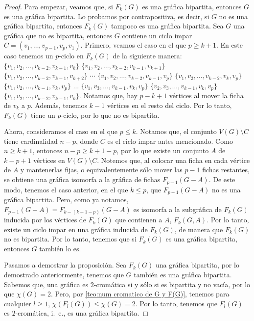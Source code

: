 \begin{proof}
    Para empezar, veamos que, si $F_k(G)$ es una gr\'afica bipartita, entonces
    $G$ es una gr\'afica bipartita. Lo probamos por contrapositiva, es decir, si
    $G$ no es una gr\'afica bipartita, entonces $F_k(G)$ tampoco es una
    gr\'afica bipartita. Sea $G$ una gr\'afica que no es bipartita, entonces $G$
    contiene un ciclo impar $C=(v_1, \dots, v_{p-1}, v_p, v_1)$. Primero, veamos
    el caso en el que $p \geq k+1$. En este caso tenemos un $p$-ciclo en
    $F_k(G)$ de la siguiente manera: $\{v_1, v_2, \dots, v_{k-2}, v_{k-1},
    v_k\}$ $\{v_1, v_2, \dots, v_{k-2}, v_{k-1}, v_{k+1}\}$ $\{v_1, v_2, \dots,
    v_{k-2}, v_{k-1}, v_{k+2}\}$ $\cdots$ $\{v_1, v_2, \dots, v_{k-2}, v_{k-1},
    v_p\}$ $\{v_1, v_2, \dots, v_{k-2}, v_k, v_p\}$ $\{v_1, v_2, \dots, v_{k-1},
    v_k, v_p\}$ $\dots$ $\{v_1, v_3, \dots, v_{k-1}, v_k, v_p\}$ $\{v_2, v_3,
    \dots, v_{k-1}, v_k, v_p\}$ $\{v_1, v_2, \dots, v_{k-2}, v_{k-1}, v_k\}$.
    Notamos que, hay $p-k+1$ v\'ertices al mover la ficha de $v_k$ a $p$.
    Adem\'as, tenemos $k-1$ v\'ertices en el resto del ciclo. Por lo tanto,
    $F_k(G)$ tiene un $p$-ciclo, por lo que no es bipartita.
    
    Ahora, consideramos el caso en el que $p \leq k$. Notamos que, el conjunto
    $V(G)\setminus C$ tiene cardinalidad $n-p$, donde $C$ es el ciclo impar
    antes mencionado. Como $n \geq k+1$, entonces $n-p \geq k+1-p$, por lo que
    existe un conjunto $A$ de $k-p+1$ v\'ertices en $V(G)\setminus C$. Notemos
    que, al colocar una ficha en cada v\'ertice de $A$ y mantenerlas fijas, o
    equivalentemente s\'olo mover las $p-1$ fichas restantes, se obtiene una
    gr\'afica isomorfa a la gr\'afica de fichas $F_{p-1}(G-A)$. De este modo,
    tenemos el caso anterior, en el que $k \leq p$, que $F_{p-1}(G-A)$ no es una
    gr\'afica bipartita. Pero, como ya notamos, $F_{p-1}(G-A) = F_{k-(k+1-p)}
    (G-A)$ es isomorfa a la subgr\'afica de $F_k(G)$ inducida por los v\'ertices
    de $F_k(G)$ que contienen a $A$, $F_k(G,A)$. Por lo tanto, existe un ciclo
    impar en una gr\'afica inducida de $F_k(G)$, de manera que $F_k(G)$ no es
    bipartita. Por lo tanto, tenemos que si $F_k(G)$ es una gr\'afica bipartita,
    entonces $G$ tambi\'en lo es.

    Pasamos a demostrar la proposici\'on. Sea $F_k(G)$ una gr\'afica bipartita,
    por lo demostrado anteriormente, tenemos que $G$ tambi\'en es una gr\'afica
    bipartita. Sabemos que, una gr\'afica es $2$-crom\'atica si y s\'olo si es
    bipartita y no vac\'ia, por lo que $\chi(G)=2$. Pero, por \cref{teo:num
    cromatico de G y F(G)}, tenemos para cualquier $l\geq 1$, $\chi (F_l(G)) \le
    \chi (G) = 2$. Por lo tanto, tenemos que $F_l(G)$ es $2$-crom\'atica, i.~e.,
    es una gr\'afica bipartita.
\end{proof}


